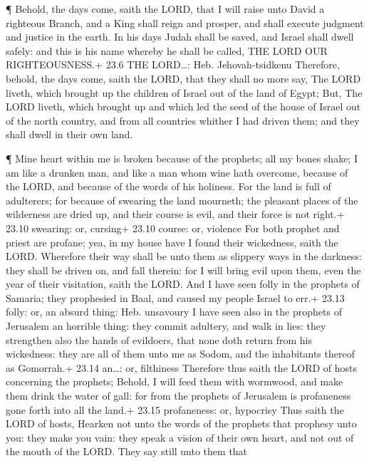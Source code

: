  ¶ Behold, the days come, saith the LORD, that I will raise
unto David a righteous Branch, and a King shall reign and prosper, and
shall execute judgment and justice in the earth.  In his
days Judah shall be saved, and Israel shall dwell safely: and this is
his name whereby he shall be called, THE LORD OUR RIGHTEOUSNESS.+ 23.6
THE LORD\ldots: Heb. Jehovah-tsidkenu  Therefore, behold,
the days come, saith the LORD, that they shall no more say, The LORD
liveth, which brought up the children of Israel out of the land of
Egypt;  But, The LORD liveth, which brought up and which led
the seed of the house of Israel out of the north country, and from all
countries whither I had driven them; and they shall dwell in their own
land.

 ¶ Mine heart within me is broken because of the prophets;
all my bones shake; I am like a drunken man, and like a man whom wine
hath overcome, because of the LORD, and because of the words of his
holiness.  For the land is full of adulterers; for because
of swearing the land mourneth; the pleasant places of the wilderness are
dried up, and their course is evil, and their force is not right.+ 23.10
swearing: or, cursing+ 23.10 course: or, violence  For both
prophet and priest are profane; yea, in my house have I found their
wickedness, saith the LORD.  Wherefore their way shall be
unto them as slippery ways in the darkness: they shall be driven on, and
fall therein: for I will bring evil upon them, even the year of their
visitation, saith the LORD.  And I have seen folly in the
prophets of Samaria; they prophesied in Baal, and caused my people
Israel to err.+ 23.13 folly: or, an absurd thing: Heb. unsavoury
 I have seen also in the prophets of Jerusalem an horrible
thing: they commit adultery, and walk in lies: they strengthen also the
hands of evildoers, that none doth return from his wickedness: they are
all of them unto me as Sodom, and the inhabitants thereof as Gomorrah.+
23.14 an\ldots: or, filthiness  Therefore thus saith the
LORD of hosts concerning the prophets; Behold, I will feed them with
wormwood, and make them drink the water of gall: for from the prophets
of Jerusalem is profaneness gone forth into all the land.+ 23.15
profaneness: or, hypocrisy  Thus saith the LORD of hosts,
Hearken not unto the words of the prophets that prophesy unto you: they
make you vain: they speak a vision of their own heart, and not out of
the mouth of the LORD.  They say still unto them that
